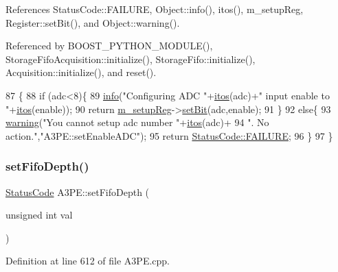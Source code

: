 References Status\+Code\+::\+F\+A\+I\+L\+U\+RE, Object\+::info(), itos(), m\+\_\+setup\+Reg, Register\+::set\+Bit(), and Object\+::warning().



Referenced by B\+O\+O\+S\+T\+\_\+\+P\+Y\+T\+H\+O\+N\+\_\+\+M\+O\+D\+U\+L\+E(), Storage\+Fifo\+Acquisition\+::initialize(), Storage\+Fifo\+::initialize(), Acquisition\+::initialize(), and reset().


\begin{DoxyCode}
87                                                           \{
88   \textcolor{keywordflow}{if} (adc<8)\{
89     \hyperlink{classObject_a644fd329ea4cb85f54fa6846484b84a8}{info}(\textcolor{stringliteral}{"Configuring ADC "}+\hyperlink{Tools_8h_af330027dbdafb9a30768b3613c553e60}{itos}(adc)+\textcolor{stringliteral}{" input enable to "}+\hyperlink{Tools_8h_af330027dbdafb9a30768b3613c553e60}{itos}(enable));
90     \textcolor{keywordflow}{return} \hyperlink{classA3PE_a142fa10b7e705c4701ae21678ec2ec8a}{m\_setupReg}->\hyperlink{classRegister_ab094246dd12aa7e0aa0ca917f4e70b31}{setBit}(adc,enable);
91   \}
92   \textcolor{keywordflow}{else}\{
93     \hyperlink{classObject_a65cd4fda577711660821fd2cd5a3b4c9}{warning}(\textcolor{stringliteral}{"You cannot setup adc number "}+\hyperlink{Tools_8h_af330027dbdafb9a30768b3613c553e60}{itos}(adc)+
94         \textcolor{stringliteral}{". No action."},\textcolor{stringliteral}{"A3PE::setEnableADC"});
95     \textcolor{keywordflow}{return} \hyperlink{classStatusCode_a6f565cbeadc76d14c72f047e5e85eb4ba3da73d4c469762eb9d3c960368252b26}{StatusCode::FAILURE};
96   \}
97 \}
\end{DoxyCode}
\mbox{\label{classA3PE_a4d8f78a1b09b409f288b34d503c71146}} 
\subsubsection{\texorpdfstring{set\+Fifo\+Depth()}{setFifoDepth()}}
{\footnotesize\ttfamily \hyperlink{classStatusCode}{Status\+Code} A3\+P\+E\+::set\+Fifo\+Depth (\begin{DoxyParamCaption}\item[{unsigned int}]{val }\end{DoxyParamCaption})}



Definition at line 612 of file A3\+P\+E.\+cpp.



